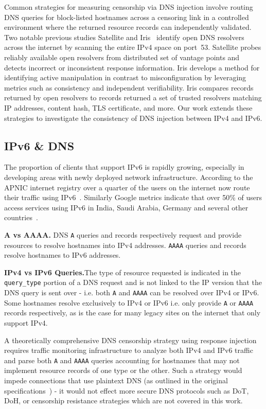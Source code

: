 Common strategies for measuring censorship via DNS injection involve routing DNS queries for
block-listed hostnames across a censoring link in a controlled environment where
the returned resource records can independently validated. Two notable previous
studies Satellite and Iris~\cite{scott2016satellite,pearce2017global} identify
open DNS resolvers across the internet by scanning the entire IPv4 space on port~53.
Satellite probes reliably available open resolvers from distributed set of vantage
points and detects incorrect or inconsistent response information. Iris develops
a method for identifying active manipulation in contrast to misconfiguration by
leveraging metrics such as consistency and independent verifiability. Iris
compares records returned by open resolvers to records returned a set of trusted
resolvers matching IP addresses, content hash, TLS certificate, and more. Our work
extends these strategies to investigate the consistency of DNS injection
between IPv4 and IPv6.

\subsection{IPv6 \& DNS}
\label{subsec:v4vsv6}

The proportion of clients that support IPv6 is rapidly growing, especially in
developing areas with newly deployed network infrastructure.
According to the APNIC internet registry over a quarter of the users
on the internet now route their traffic using IPv6~\cite{Huston-APNIC2021}.
Similarly Google metrics indicate that over 50\% of users access services using
IPv6 in India, Saudi Arabia, Germany and several other countries~\cite{Google-IPv6}.

\textbf{A vs AAAA.} DNS \texttt{A} queries and records respectively request and provide
resources to resolve hostnames into IPv4 addresses. \texttt{AAAA} queries and
records resolve hostnames to IPv6 addresses.

\textbf{IPv4 vs IPv6 Queries.}The type of resource requested is
indicated in the \texttt{query\_type} portion of a DNS request and is not linked
to the IP version that the DNS query is sent over - i.e. both \texttt{A} and
\texttt{AAAA} can be resolved over IPv4 or IPv6.
Some hostnames resolve exclusively to IPv4 or IPv6 i.e. only provide \texttt{A}
or \texttt{AAAA} records respectively, as is the case for many legacy sites on
the internet that only support IPv4.

A theoretically comprehensive DNS censorship strategy using response injection
requires traffic monitoring infrastructure to analyze both IPv4 and IPv6
traffic and parse both \texttt{A} and \texttt{AAAA} queries accounting for hostnames
that may not implement resource records of one type or the other. Such a strategy
would impede connections that use plaintext DNS (as outlined in the
original specifications~\cite{RFC1035,RFC3596}) - it would not effect more secure DNS
protocols such as DoT, DoH, or censorship resistance strategies which are not
covered in this work.

